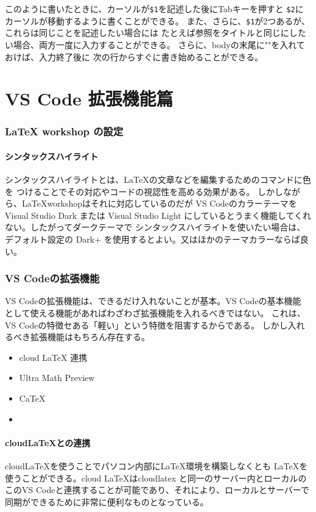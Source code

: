 \documentclass{ltjsarticle}
\begin{document}
このように書いたときに、カーソルが\verb|$1|を記述した後にTabキーを押すと
\verb|$2|にカーソルが移動するように書くことができる。
また、さらに、\verb|$1|が2つあるが、これらは同じことを記述したい場合には
たとえば参照をタイトルと同じにしたい場合、両方一度に入力することができる。
さらに、bodyの末尾に""を入れておけば、入力終了後に
次の行からすぐに書き始めることができる。


\part{VS Code 拡張機能篇}
\section{LaTeX workshop の設定}
\subsection{シンタックスハイライト}
シンタックスハイライトとは、LaTeXの文章などを編集するためのコマンドに色を
つけることでその対応やコードの視認性を高める効果がある。
しかしながら、\LaTeX workshopはそれに対応しているのだが
VS CodeのカラーテーマをVisual Studio Dark または Visual Studio Light
にしているとうまく機能してくれない。したがってダークテーマで
シンタックスハイライトを使いたい場合は、デフォルト設定の
Dark+ を使用するとよい。又はほかのテーマカラーならば良い。

\section{VS Codeの拡張機能}
VS Codeの拡張機能は、できるだけ入れないことが基本。VS Codeの基本機能
として使える機能があればわざわざ拡張機能を入れるべきではない。
これは、VS Codeの特徴セある「軽い」という特徴を阻害するからである。
しかし入れるべき拡張機能はもちろん存在する。
\begin{itemize}
\item cloud LaTeX 連携
\item Ultra Math Preview
\item CaTeX
\item 
\end{itemize}

\subsection{cloud\LaTeX との連携}
cloud\LaTeX を使うことでパソコン内部に\LaTeX 環境を構築しなくとも
\LaTeX を使うことができる。cloud \LaTeX はcloudlatex と同一のサーバー内とローカルのこのVS Codeと連携することが可能であり、それにより、ローカルとサーバーで同期ができるために非常に便利なものとなっている。
\end{document}
